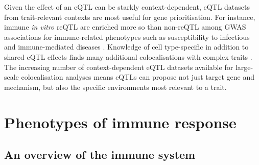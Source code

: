 \begin{outline}
Given the effect of an \gls{eQTL} can be starkly context-dependent, 
\gls{eQTL} datasets from trait-relevant contexts are most useful for gene prioritisation.
For instance, immune \textit{in vitro} \gls{reQTL} are enriched more so than non-\gls{reQTL} among \gls{GWAS} associations for immune-related phenotypes such as
susceptibility to infectious \autocite{barreiro2012DecipheringGeneticArchitecture,manry2017DecipheringGeneticControl}
and immune-mediated diseases \autocite{manry2017DecipheringGeneticControl,kim-hellmuth2017GeneticRegulatoryEffects}.
Knowledge of cell type-specific in addition to shared \gls{eQTL} effects 
finds many additional colocalisations with complex traits \autocite{kundu2020GeneticAssociationsRegulatory,kim-hellmuth2020CellTypeSpecific}.
The increasing number of context-dependent \gls{eQTL} datasets available for large-scale colocalisation analyses means \glspl{eQTL} can propose not just target gene and mechanism, but also the specific environments most relevant to a trait.


\section{Phenotypes of immune response}

\subsection{An overview of the immune system}


\end{outline}
